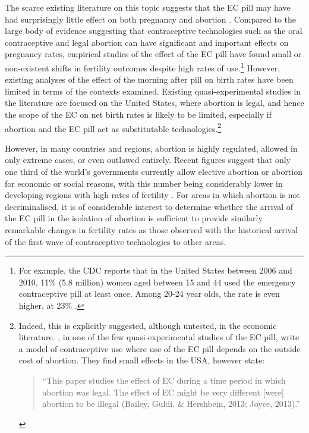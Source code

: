 The scarce existing literature on this topic suggests that the EC pill may have 
had surprisingly little effect on both pregnancy and abortion 
\citep{Grossetal2014,Durrance2013}. Compared to the large body of evidence 
suggesting that contraceptive technologies such as the oral contraceptive and 
legal abortion can have significant and important effects on pregnancy rates, 
empirical studies of the effect of the EC pill have found small or non-existent 
shifts in fertility outcomes despite high rates of use.\footnote{For example, 
the CDC reports that in the United States between 2006 and 2010, 11\% (5.8 
million) women aged between 15 and 44 used the emergency contraceptive pill at 
least once.  Among 20-24 year olds, the rate is even higher, at 23\% 
\citep{Danielsetal2013}.}  However, existing analyses of the effect of the 
morning after pill on birth rates have been limited in terms of the contexts 
examined.  Existing quasi-experimental studies in the literature are focused on 
the United States, where abortion is legal, and hence the scope of the EC on 
net birth rates is likely to be limited, especially if abortion and the EC pill
act as substitutable technologies.\footnote{Indeed, this is explicitly 
suggested, although untested, in the economic literature. \citet{Grossetal2014}, 
in one of the few quasi-experimental studies of the EC pill, write a model of 
contraceptive use where use of the EC pill depends on the outside cost of 
abortion. They find small effects in the USA, however state:
     \begin{quote}
     ``This paper studies the effect of EC during a time period in which
     abortion was legal. The effect of EC might be very different [were]
     abortion to be illegal (Bailey, Guldi, \& Hershbein, 2013; Joyce,
     2013).''
     \end{quote}}

However, in many countries and regions, abortion is highly regulated, allowed
in only extreme cases, or even outlawed entirely.  Recent figures suggest that 
only one third of the world's governments currently allow elective abortion or 
abortion for economic or social reasons, with this number being considerably 
lower in developing regions with high rates of fertility \citep{UN2014}.  For 
areas in which abortion is not decriminalised, it is of considerable interest 
to determine whether the arrival of the EC pill in the isolation of abortion 
is sufficient to provide similarly remarkable changes in fertility rates as 
those observed with the historical arrival of the first wave of contraceptive 
technologies to other areas.


